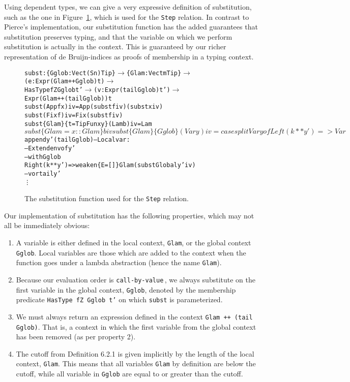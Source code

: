 Using dependent types, we can give a very expressive definition of substitution, such as the one in Figure~\ref{fig:subst}, which is used for the \texttt{Step} relation. In contrast to Pierce's implementation, our substitution function has the added guarantees that substitution preserves typing, and that the variable on which we perform substitution is actually in the context. This is guaranteed by our richer representation of de Bruijn-indices as proofs of membership in a typing context.  
\begin{figure}
\begin{alltt}
subst : \{Gglob : Vect (S n) Tip\} \(\rightarrow\) \{Glam: Vect m Tip\} \(\rightarrow\) 
                 (e: Expr (Glam ++ Gglob) t) \(\rightarrow\) 
                 HasType fZ Gglob t' \(\rightarrow\) (v: Expr (tail Gglob) t') \(\rightarrow\) 
                 Expr (Glam ++ (tail Gglob)) t
subst                     (App f x) i v = App (subst f i v) (subst x i v)
subst                       (Fix f) i v = Fix (subst f i v)
subst \{Glam\} \{t=TipFun x y\} (Lam b) i v = Lam $ subst \{Glam=x::Glam\} b i v
subst \{Glam\} \{Gglob\}        (Var y) i v = 
  case splitVar y of
    Left  (k ** y') => Var $ append y' (tail Gglob) -- Local var: 
                                                    -- Extend env of y'
                                                    -- with Gglob
    Right (k ** y') => weaken \{E=[]\} Glam (substGlobal y' i v) 
                                                    -- v or tail y'
\vdots
\end{alltt}
\caption{The substitution function used for the \texttt{Step} relation.}
\label{fig:subst}
\end{figure}
Our implementation of substitution has the following properties, which may not all be immediately obvious:
\begin{enumerate}
\item A variable is either defined in the local context, \texttt{Glam}, or the global context \texttt{Gglob}. Local variables are those which are added to the context when the function goes under a lambda abstraction (hence the name \texttt{Glam}).
\item Because our evaluation order is \texttt{call-by-value}\,\cite[pp. 57-58]{Pierce:TypeSystems}, we always substitute on the first variable in the global context, \texttt{Gglob}, denoted by the membership predicate \texttt{HasType fZ Gglob t'} on which \texttt{subst} is parameterized. 
\item We must always return an expression defined in the context \texttt{Glam~++~(tail Gglob)}. That is, a context in which the first variable from the global context has been removed (as per property 2).
\item The cutoff from Definition 6.2.1 is given implicitly by the length of the local context, \texttt{Glam}. This means that all variables \texttt{Glam} by definition are below the cutoff, while all variable in \texttt{Gglob} are equal to or greater than the cutoff.
\end{enumerate}

